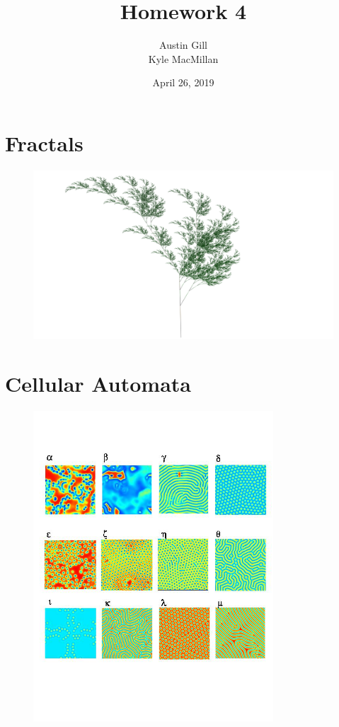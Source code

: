\documentclass[12pt]{article}
\title{Homework 4}
\author{Austin Gill \\ Kyle MacMillan}
\date{April 26, 2019}
\begin{document}
\maketitle
\begingroup
\hypersetup{linkcolor=black}
\tableofcontents
\listoftodos
\endgroup
\newpage

\part{Fractals}
\vfill
\begin{figure}[H]
    \centering
    \includegraphics[width=\textwidth]{figures/L-systems/a.png}
\end{figure}




\part{Cellular Automata}
\begin{figure}[H]
    \centering
    \includegraphics[width=0.8\textwidth]{figures/reactions/patterns.jpg}
\end{figure}


\end{document}
